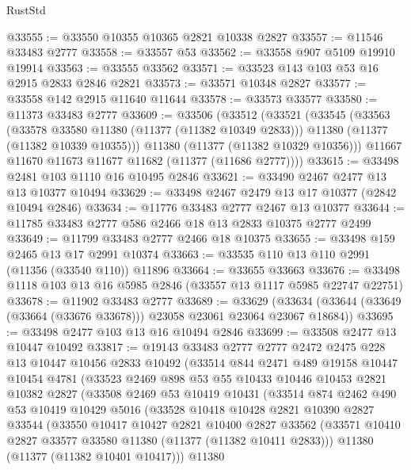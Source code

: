 \begin{lexlean}{RustStd}
\begin{coremodule}
@33555 := @33550 @10355 @10365 @2821 @10338 @2827
@33557 := @11546 @33483 @2777
@33558 := @33557 @53
@33562 := @33558 @907 @5109 @19910 @19914
@33563 := @33555 @33562
@33571 := @33523 @143 @103 @53 @16 @2915 @2833 @2846 @2821
@33573 := @33571 @10348 @2827
@33577 := @33558 @142 @2915 @11640 @11644
@33578 := @33573 @33577
@33580 := @11373 @33483 @2777
@33609 := @33506
    (@33512
      (@33521
        (@33545
          (@33563
            (@33578 @33580 @11380 (@11377 (@11382 @10349 @2833)))
            @11380
            (@11377 (@11382 @10339 @10355)))
          @11380
          (@11377 (@11382 @10329 @10356)))
        @11667
        @11670
        @11673
        @11677
        @11682
        (@11377 (@11686 @2777))))
@33615 := @33498 @2481 @103 @1110 @16 @10495 @2846
@33621 := @33490 @2467 @2477 @13 @13 @10377 @10494
@33629 := @33498 @2467 @2479 @13 @17 @10377 (@2842 @10494 @2846)
@33634 := @11776 @33483 @2777 @2467 @13 @10377
@33644 := @11785 @33483 @2777 @586 @2466 @18 @13 @2833 @10375 @2777 @2499
@33649 := @11799 @33483 @2777 @2466 @18 @10375
@33655 := @33498 @159 @2465 @13 @17 @2991 @10374
@33663 := @33535 @110 @13 @110 @2991 (@11356 (@33540 @110)) @11896
@33664 := @33655 @33663
@33676 := @33498 @1118 @103 @13 @16 @5985 @2846 (@33557 @13 @1117 @5985 @22747 @22751)
@33678 := @11902 @33483 @2777
@33689 := @33629
    (@33634 (@33644 (@33649 (@33664 (@33676 @33678))) @23058 @23061 @23064 @23067 @18684))
@33695 := @33498 @2477 @103 @13 @16 @10494 @2846
@33699 := @33508 @2477 @13 @10447 @10492
@33817 := @19143
    @33483
    @2777
    @2777
    @2472
    @2475
    @228
    @13
    @10447
    @10456
    @2833
    @10492
    (@33514
      @844
      @2471
      @489
      @19158
      @10447
      @10454
      @4781
      (@33523
        @2469
        @898
        @53
        @55
        @10433
        @10446
        @10453
        @2821
        @10382
        @2827
        (@33508
          @2469
          @53
          @10419
          @10431
          (@33514
            @874
            @2462
            @490
            @53
            @10419
            @10429
            @5016
            (@33528
              @10418
              @10428
              @2821
              @10390
              @2827
              @33544
              (@33550
                @10417
                @10427
                @2821
                @10400
                @2827
                @33562
                (@33571 @10410 @2827 @33577 @33580 @11380 (@11377 (@11382 @10411 @2833)))
                @11380
                (@11377 (@11382 @10401 @10417)))
              @11380

\end{coremodule}
\end{lexlean}
